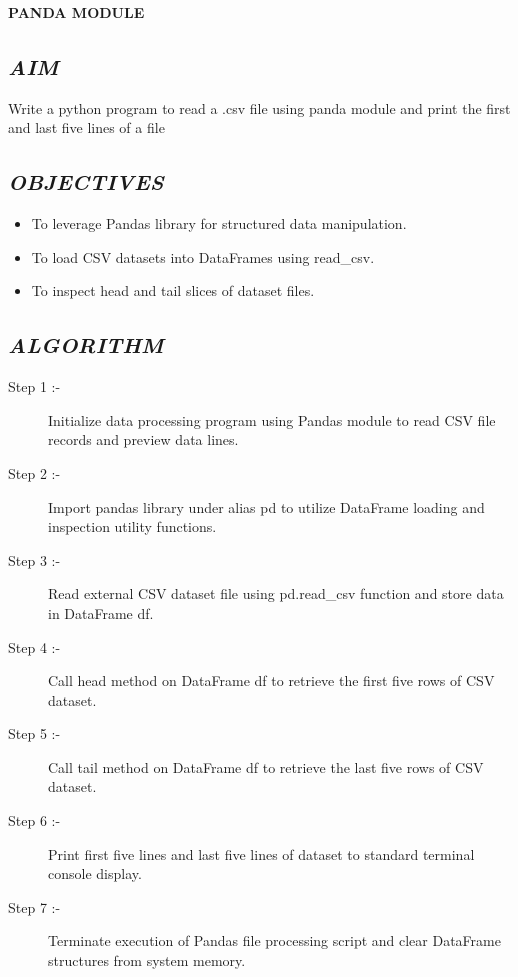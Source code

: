 \documentclass[11pt,a4paper]{article}
\begin{document}
\vspace{0.2cm}
\begin{center}
{\Huge \textbf{\textcolor{navyblue}{PANDA MODULE}}}
\end{center}
\vspace{0.3cm}

\subsection*{\textit{AIM}}
Write a python program to read a .csv file using panda module and print the first and last five lines of a file

\subsection*{\textit{OBJECTIVES}}
\begin{itemize}
  \item To leverage Pandas library for structured data manipulation.
  \item To load CSV datasets into DataFrames using read_csv.
  \item To inspect head and tail slices of dataset files.
\end{itemize}

\subsection*{\textit{ALGORITHM}}
\begin{description}
  \item[Step 1 :-] Initialize data processing program using Pandas module to read CSV file records and preview data lines.
  \item[Step 2 :-] Import pandas library under alias pd to utilize DataFrame loading and inspection utility functions.
  \item[Step 3 :-] Read external CSV dataset file using pd.read_csv function and store data in DataFrame df.
  \item[Step 4 :-] Call head method on DataFrame df to retrieve the first five rows of CSV dataset.
  \item[Step 5 :-] Call tail method on DataFrame df to retrieve the last five rows of CSV dataset.
  \item[Step 6 :-] Print first five lines and last five lines of dataset to standard terminal console display.
  \item[Step 7 :-] Terminate execution of Pandas file processing script and clear DataFrame structures from system memory.
\end{description}
\end{document}
